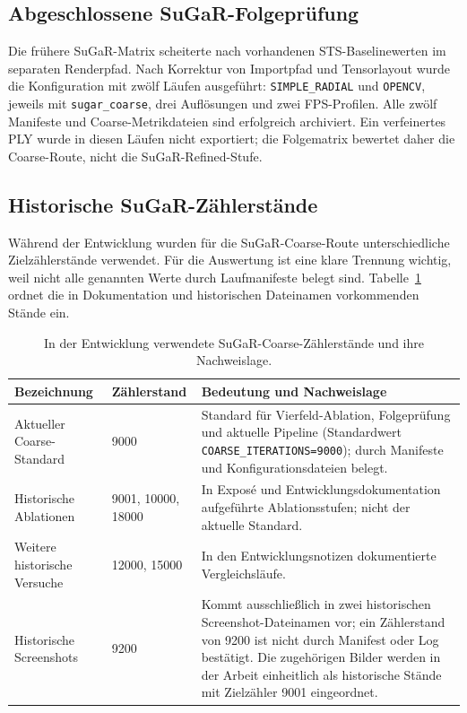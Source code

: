 \subsection{Abgeschlossene SuGaR-Folgeprüfung}

Die frühere SuGaR-Matrix scheiterte nach vorhandenen STS-Baselinewerten im
separaten Renderpfad. Nach Korrektur von Importpfad und Tensorlayout wurde die
Konfiguration mit zwölf Läufen ausgeführt: \texttt{SIMPLE\_RADIAL} und
\texttt{OPENCV}, jeweils mit \texttt{sugar\_coarse}, drei Auflösungen und zwei
FPS-Profilen. Alle zwölf Manifeste und Coarse-Metrikdateien sind erfolgreich
archiviert. Ein verfeinertes PLY wurde in diesen Läufen nicht exportiert; die
Folgematrix bewertet daher die Coarse-Route, nicht die SuGaR-Refined-Stufe.

\subsection{Historische SuGaR-Zählerstände}

Während der Entwicklung wurden für die SuGaR-Coarse-Route unterschiedliche
Zielzählerstände verwendet. Für die Auswertung ist eine klare Trennung wichtig,
weil nicht alle genannten Werte durch Laufmanifeste belegt sind.
Tabelle~\ref{tab:sugar-zaehlerstaende} ordnet die in Dokumentation und
historischen Dateinamen vorkommenden Stände ein.

\begin{table}[H]
\centering
\small
\begin{tabularx}{\textwidth}{p{2.6cm}p{3.0cm}X}
\toprule
Bezeichnung & Zählerstand & Bedeutung und Nachweislage\\
\midrule
Aktueller Coarse-Standard & 9000 & Standard für Vierfeld-Ablation,
Folgeprüfung und aktuelle Pipeline (Standardwert
\texttt{COARSE\_ITERATIONS=9000}); durch Manifeste und
Konfigurationsdateien belegt.\\
Historische Ablationen & 9001, 10000, 18000 & In Exposé und
Entwicklungsdokumentation aufgeführte Ablationsstufen; nicht der aktuelle
Standard.\\
Weitere historische Versuche & 12000, 15000 & In den Entwicklungsnotizen
dokumentierte Vergleichsläufe.\\
Historische Screenshots & 9200 & Kommt ausschließlich in zwei historischen
Screenshot-Dateinamen vor; ein Zählerstand von 9200 ist nicht durch Manifest
oder Log bestätigt. Die zugehörigen Bilder werden in der Arbeit einheitlich
als historische Stände mit Zielzähler 9001 eingeordnet.\\
\bottomrule
\end{tabularx}
\caption{In der Entwicklung verwendete SuGaR-Coarse-Zählerstände und ihre
Nachweislage.}
\label{tab:sugar-zaehlerstaende}
\end{table}

